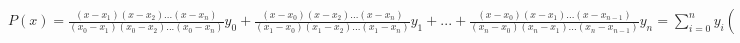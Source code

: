 {\normalsize
    
    $P(x) = \frac{(x-x_1)(x-x_2)...(x-x_n)}{(x_0-x_1)(x_0-x_2)...(x_0-x_n)}y_0 + 
    \frac{(x-x_0)(x-x_2)...(x-x_n)}{(x_1-x_0)(x_1-x_2)...(x_1-x_n)}y_1 + ... +
    \frac{(x-x_0)(x-x_1)...(x-x_{n-1})}{(x_n-x_0)(x_n-x_1)...(x_n-x_{n-1})}y_n
    =\sum_{i=0}^{n} y_i (\prod_{j=0, i\neq j}^{n} \frac{x-x_j}{x_i-x_j} )
    $
}
